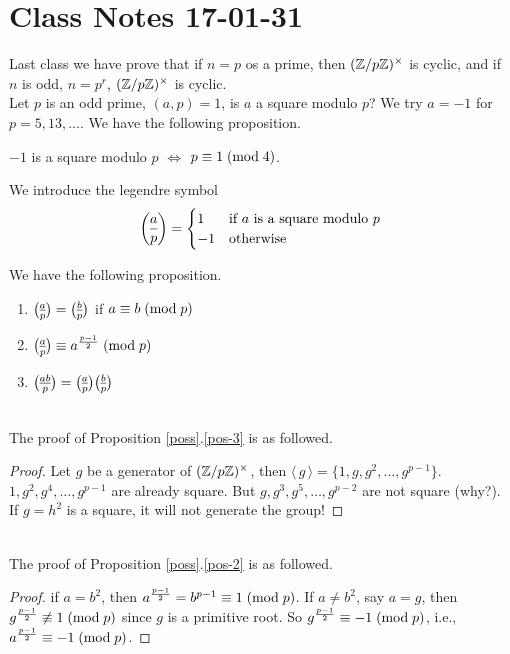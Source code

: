 \documentclass{mynotes}
\begin{document}
\section{Class Notes 17-01-31}
Last class we have prove that if $n=p$ os a prime, then $(\mathbb{Z}/p\mathbb{Z})^{\times}$ is cyclic, and if $n$ is odd, $n=p^r$, $(\mathbb{Z}/p\mathbb{Z})^{\times}$ is cyclic.\notcomplete
\mbox{}\\
Let $p$ is an odd prime, $(a,p) = 1$, is $a$ a square modulo $p$? We try $a=-1$ for $p=5,13,\ldots$. We have the following proposition.
\begin{proposition}
	$-1$ is a square modulo $p$ $\Longleftrightarrow$ $p\equiv 1\;(\mbox{mod}{\;4})$.
\end{proposition}
\begin{definition}
	We introduce the legendre symbol 
	\begin{equation*}
	\leg{a}{p}=\begin{cases}
	1 & \text{if $a$ is a square modulo $p$}\\
	-1 & \text{otherwise}
	\end{cases}
	\end{equation*}
\end{definition}
We have the following proposition.
\begin{proposition}\mbox{}\label{poss}
	\begin{enumerate}
		\item
		$\leg{a}{p} = \leg{b}{p}$ if $a\equiv b\;(\mbox{mod}{\;p})$
		\item\label{pos-2}
		$\leg{a}{p}\con{a^{\frac{p-1}{2}}}{p}$
		\item\label{pos-3}
		$\leg{ab}{p} = \leg{a}{p}\leg{b}{p}$
	\end{enumerate}
\end{proposition}
\mbox{}\\The proof of Proposition \ref{poss}.\ref{pos-3} is as followed.
\begin{proof}
Let $g$ be a generator of $(\mathbb{Z}/p\mathbb{Z})^\times$, then  $\langle\,g\,\rangle = \{1,g,g^2,\ldots,g^{p-1} \}$. $1,g^2,g^4,\ldots, g^{p-1}$ are already square. But $g,g^3,g^5,\ldots, g^{p-2}$ are not square (why?). If $g=h^2$ is a square, it will not generate the group!
\end{proof}
\mbox{}\\The proof of Proposition \ref{poss}.\ref{pos-2} is as followed.
\begin{proof}
if $a=b^2$, then $a^{\frac{p-1}{2}}=b^{p-1}\equiv 1\;(\mbox{mod}{\;p})$. If $a\ne b^2$, say $a=g$, then $g^{\frac{p-1}{2}}\not\equiv 1\;(\mbox{mod}{\;p})$ since $g$ is a primitive root. So $g^{\frac{p-1}{2}}\equiv -1\;(\mbox{mod}{\;p})$, i.e., $a^{\frac{p-1}{2}}\equiv -1\;(\mbox{mod}{\;p})$.
\end{proof}
\end{document}
